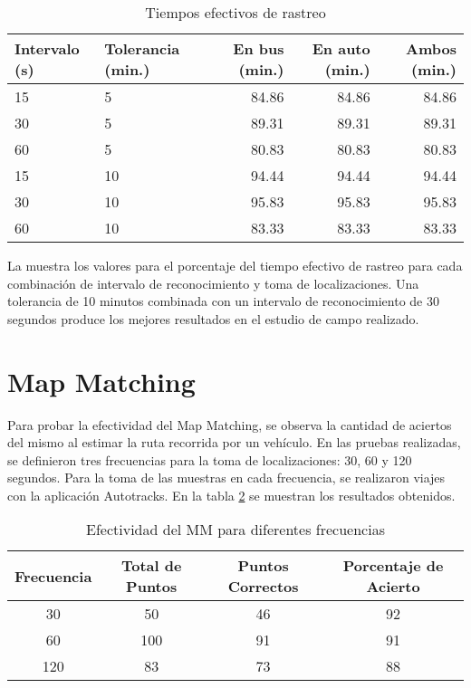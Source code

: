 \begin{table}[h]
  \centering
	\begin{tabular}{llrrr}
	\toprule
	Intervalo (s) & Tolerancia (min.) & En bus (min.) & En auto (min.) & Ambos (min.) \\
	\midrule
	15            & 5                 & 84.86         & 84.86          & 84.86        \\
	30            & 5                 & 89.31         & 89.31          & 89.31        \\
	60            & 5                 & 80.83         & 80.83          & 80.83        \\
	15            & 10                & 94.44         & 94.44          & 94.44        \\
	30            & 10                & 95.83         & 95.83          & 95.83        \\
	60            & 10                & 83.33         & 83.33          & 83.33        \\
	\bottomrule
	\end{tabular}
  \caption{Tiempos efectivos de rastreo}
  \label{tab:prom_tiempo_efectivo_rastreo}
\end{table}

La  muestra los valores para el porcentaje del tiempo efectivo de rastreo para cada combinación de intervalo de reconocimiento y toma de localizaciones. Una tolerancia de 10 minutos combinada con un intervalo de reconocimiento de 30 segundos produce los mejores resultados en el estudio de campo realizado.

\section{Map Matching}

Para probar la efectividad del Map Matching, se observa la cantidad de aciertos del mismo al estimar la ruta recorrida por un vehículo. En las pruebas realizadas, se definieron  tres frecuencias para la toma de localizaciones: 30, 60 y 120 segundos. Para la toma de las muestras en cada frecuencia, se realizaron viajes con la aplicación Autotracks. En la tabla \ref{table:map_matching} se muestran los resultados obtenidos.

\begin{table}[ht]
	\caption{Efectividad del MM para diferentes frecuencias} 
	\centering
	\begin{tabular}{c c c c}
		\hline\hline
		Frecuencia & Total de Puntos & Puntos Correctos & Porcentaje de Acierto\\ [0.5ex]
		\hline
		30 & 50 & 46 & 92 \\
		60 & 100 & 91 & 91 \\
		120 & 83 & 73 & 88\\ [1ex]
		\hline
	\end{tabular}
	\label{table:map_matching}
\end{table}
